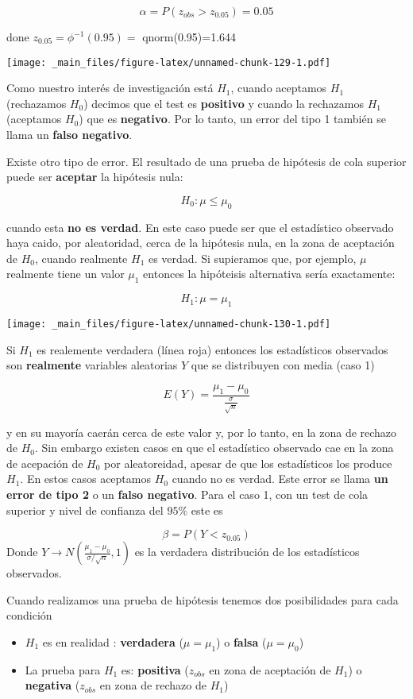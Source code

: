 \documentclass[
]{book}
\providecommand{\tightlist}{%
  \setlength{\itemsep}{0pt}\setlength{\parskip}{0pt}}
\begin{document}
\[\alpha = P(z_{obs}> z_{0.05})=0.05\]

done \(z_{0.05}=\phi^{-1}(0.95)=\) qnorm(0.95)=1.644

\texttt{[image: \_main\_files/figure-latex/unnamed-chunk-129-1.pdf]}

Como nuestro interés de investigación está \(H_1\), cuando aceptamos \(H_1\) (rechazamos \(H_0\)) decimos que el test es \textbf{positivo} y cuando la rechazamos \(H_1\) (aceptamos \(H_0\)) que es \textbf{negativo}. Por lo tanto, un error del tipo 1 también se llama un \textbf{falso negativo}.

Existe otro tipo de error. El resultado de una prueba de hipótesis de cola superior puede ser \textbf{aceptar} la hipótesis nula:

\[H_0: \mu\leq\mu_0\]

cuando esta \textbf{no es verdad}. En este caso puede ser que el estadístico observado haya caido, por aleatoridad, cerca de la hipótesis nula, en la zona de aceptación de \(H_0\), cuando realmente \(H_1\) es verdad. Si supieramos que, por ejemplo, \(\mu\) realmente tiene un valor \(\mu_1\) entonces la hipóteisis alternativa sería exactamente:

\[H_1: \mu=\mu_1\]

\texttt{[image: \_main\_files/figure-latex/unnamed-chunk-130-1.pdf]}

Si \(H_1\) es realemente verdadera (línea roja) entonces los estadísticos observados son \textbf{realmente} variables aleatorias \(Y\) que se distribuyen con media (caso 1)

\[E(Y)=\frac{\mu_1-\mu_0}{\frac{\sigma}{\sqrt{n}}}\]

y en su mayoría caerán cerca de este valor y, por lo tanto, en la zona de rechazo de \(H_0\). Sin embargo existen casos en que el estadístico observado cae en la zona de acepación de \(H_0\) por aleatoreidad, apesar de que los estadísticos los produce \(H_1\). En estos casos aceptamos \(H_0\) cuando no es verdad. Este error se llama \textbf{un error de tipo 2} o un \textbf{falso negativo}. Para el caso 1, con un test de cola superior y nivel de confianza del \(95\%\) este es

\[ \beta= P(Y < z_{0.05})\]
Donde \(Y \rightarrow N(\frac{\mu_1-\mu_0}{\sigma/\sqrt{n}},1)\) es la verdadera distribución de los estadísticos observados.

Cuando realizamos una prueba de hipótesis tenemos dos posibilidades para cada condición

\begin{itemize}
\tightlist
\item
  \(H_1\) es en realidad : \textbf{verdadera} (\(\mu=\mu_1\)) o \textbf{falsa} (\(\mu=\mu_0\))
\item
  La prueba para \(H_1\) es: \textbf{positiva} (\(z_{obs}\) en zona de aceptación de \(H_1\)) o \textbf{negativa} (\(z_{obs}\) en zona de rechazo de \(H_1\))
\end{itemize}
\end{document}
